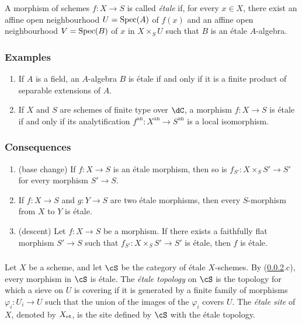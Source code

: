 A morphism of schemes $f:X\to S$ is called \emph{étale} if, for every
$x\in X$, there exist an affine open neighbourhood $U=\operatorname{Spec}(A)$ of
$f(x)$ and an affine open neighbourhood $V=\operatorname{Spec}(B)$ of $x$ in
$X\times_SU$ such that $B$ is an étale $A$-algebra.

\subsubsection{Examples}\label{I:2-1-2}
\begin{enumerate}[\indent a)]
  \item If $A$ is a field, an $A$-algebra $B$ is étale if and only if it
    is a finite product of separable extensions of $A$.
  \item If $X$ and $S$ are schemes of finite type over $\dC$, a morphism
    $f:X\to S$ is étale if and only if its analytification
    $f^{\text{an}}:X^{\text{an}}\to S^{\text{an}}$ is a local
    isomorphism.
\end{enumerate}

\subsubsection{Consequences}\label{I:2-1-3}
\begin{enumerate}[\indent a)]
  \item (base change) If $f:X\to S$ is an étale morphism, then so is
    $f_{S'}:X\times_SS'\to S'$ for every morphism $S'\to S$.
  \item If $f:X\to S$ and $g:Y\to S$ are two étale morphisms, then every
    $S$-morphism from $X$ to $Y$ is étale.
  \item (descent) Let $f:X\to S$ be a morphism. If there exists a
    faithfully flat morphism $S'\to S$ such that
    $f_{S'}:X\times_SS'\to S'$ is étale, then $f$ is étale.
\end{enumerate}

\subsubsection{}\label{I:2-1-4}

Let $X$ be a scheme, and let $\cS$ be the category of étale
$X$-schemes. By (\ref{I:2-1-3}.c), every morphism in $\cS$ is étale.
The \emph{étale topology} on $\cS$ is the topology for which a sieve on
$U$ is covering if it is generated by a finite family of morphisms
$\varphi_i:U_i\to U$ such that the union of the images of the
$\varphi_i$ covers $U$. The \emph{étale site} of $X$, denoted by
${X}_{\textnormal{et}}$, is the site defined by $\cS$ with the étale topology.

